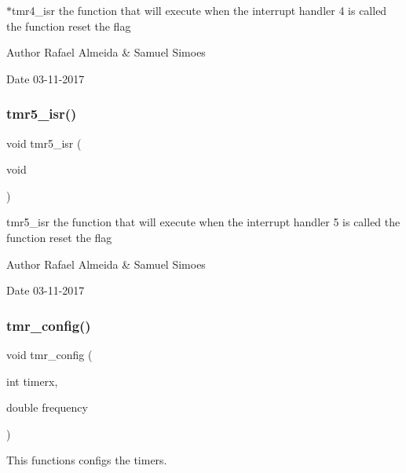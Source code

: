 $\ast$tmr4\+\_\+isr the function that will execute when the interrupt handler 4 is called the function reset the flag 

\begin{DoxyAuthor}{Author}
Rafael Almeida \& Samuel Simoes 
\end{DoxyAuthor}
\begin{DoxyDate}{Date}
03-\/11-\/2017 
\end{DoxyDate}
\mbox{\label{timer__libs_8c_ae868a352a2c5a724c8ac9cf5054ad78c}} 
\subsubsection{tmr5\+\_\+isr()}
{\footnotesize\ttfamily void tmr5\+\_\+isr (\begin{DoxyParamCaption}\item[{void}]{ }\end{DoxyParamCaption})}



tmr5\+\_\+isr the function that will execute when the interrupt handler 5 is called the function reset the flag 

\begin{DoxyAuthor}{Author}
Rafael Almeida \& Samuel Simoes 
\end{DoxyAuthor}
\begin{DoxyDate}{Date}
03-\/11-\/2017 
\end{DoxyDate}
\mbox{\label{timer__libs_8c_a024ce1fdffe7ce7f215ed2aea77c01c6}} 
\subsubsection{tmr\+\_\+config()}
{\footnotesize\ttfamily void tmr\+\_\+config (\begin{DoxyParamCaption}\item[{int}]{timerx,  }\item[{double}]{frequency }\end{DoxyParamCaption})}



This functions configs the timer\textquotesingle{}s. 


